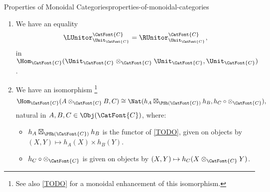 \begin{proposition}{Properties of Monoidal Categories}{properties-of-monoidal-categories}
\begin{enumerate}
\[\begin{tikzcd}[row sep={7.0*\the\DL,between origins}, column sep={6.0*\the\DL,between origins}, background color=backgroundColor, ampersand replacement=\&]
                    \arrow[rd, "\RUnitor^{\CatFont{C}}_{A\otimes_{\CatFont{C}}B}"']
                    \&\&
                    A\otimes_{\CatFont{C}}(B\otimes_{\CatFont{C}}\Unit_{\CatFont{C}})
                    \arrow[ld, "\id_{A}\otimes_{\CatFont{C}}\RUnitor^{\CatFont{C}}_{B}"]
                    \\\&
                    A\otimes_{\CatFont{C}}B
                    \&
                \end{tikzcd}
            \]%
        \item\label{properties-of-monoidal-categories-coherence-for-left-and-right-unitors-of-the-monoidal-unit}We have an equality
            \[
                \LUnitor^{\CatFont{C}}_{\Unit_{\CatFont{C}}}
                =
                \RUnitor^{\CatFont{C}}_{\Unit_{\CatFont{C}}},
            \]
            in $\Hom_{\CatFont{C}}(\Unit_{\CatFont{C}}\otimes_{\CatFont{C}}\Unit_{\CatFont{C}},\Unit_{\CatFont{C}})$.
        \item\label{properties-of-monoidal-categories-interaction-with-representable-functors}We have an isomorphism%
            \footnote{%
                See also \cref{TODO} for a monoidal enhancement of this isomorphism.%
            }%
            \[
                \Hom_{\CatFont{C}}(A\otimes_{\CatFont{C}}B,C)%
                \cong
                \Nat(h_{A}\boxtimes_{\PSh(\CatFont{C})}h_{B},h_{C}\circ\mathord{\otimes_{\CatFont{C}}}),%
            \]%
            natural in $A,B,C\in\Obj(\CatFont{C})$, where:
            \begin{itemize}
                \item $h_{A}\boxtimes_{\PSh(\CatFont{C})}h_{B}$ is the functor of \cref{TODO}, given on objects by $(X,Y)\mapsto h_{A}(X)\times h_{B}(Y)$.
                \item $h_{C}\circ\mathord{\otimes_{\CatFont{C}}}$ is given on objects by $(X,Y)\mapsto h_{C}(X\otimes_{\CatFont{C}}Y)$.
            \end{itemize}
    \end{enumerate}
\end{proposition}
